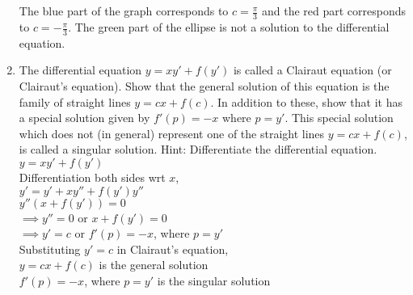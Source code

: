 \documentclass[a4paper]{article}
\begin{document}
\begin{enumerate}
{
\\
\\The blue part of the graph corresponds to $c=\frac{\pi}{3}$ and the red part corresponds to $c=-\frac{\pi}{3}$. The green part of the ellipse is not a solution to the differential equation.
}

\item{The differential equation $y=xy'+f(y')$ is called a Clairaut equation (or Clairaut's equation). Show that the general solution of this equation is the family of straight lines $y=cx + f(c)$. In addition to these, show that it has a special solution given by $f'(p)=-x$ where $p=y'$. This special solution which does not (in general) represent one of the straight lines $y=cx+f(c)$, is called a singular solution. Hint: Differentiate the differential equation.
\\$y=xy'+f(y')$
\\Differentiation both sides wrt $x$,
\\$y'=y'+xy''+f(y')y''$
\\$y''(x+f(y'))=0$
\\$\implies y''=0$ or $x+f(y')=0$
\\$\implies y'=c$ or $f'(p)=-x$, where $p=y'$
\\Substituting $y'=c$ in Clairaut's equation,
\\$y=cx+f(c)$ is the general solution
\\$f'(p)=-x$, where $p=y'$ is the singular solution
}


\end{enumerate}
\end{document}
